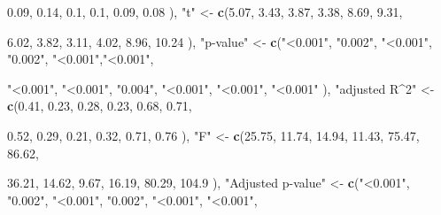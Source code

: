 \documentclass[
]{article}
\newenvironment{Shaded}{\begin{snugshade}}{\end{snugshade}}
\newcommand{\FloatTok}[1]{\textcolor[rgb]{0.00,0.00,0.81}{#1}}
\newcommand{\KeywordTok}[1]{\textcolor[rgb]{0.13,0.29,0.53}{\textbf{#1}}}
\newcommand{\NormalTok}[1]{#1}
\newcommand{\StringTok}[1]{\textcolor[rgb]{0.31,0.60,0.02}{#1}}
\begin{document}
\begin{Shaded}
\begin{Highlighting}[]
                                      \FloatTok{0.09}\NormalTok{, }\FloatTok{0.14}\NormalTok{, }\FloatTok{0.1}\NormalTok{, }\FloatTok{0.1}\NormalTok{, }\FloatTok{0.09}\NormalTok{, }\FloatTok{0.08}
\NormalTok{                                      ), }
                \StringTok{"t"}\NormalTok{ <-}\StringTok{ }\KeywordTok{c}\NormalTok{(}\FloatTok{5.07}\NormalTok{, }\FloatTok{3.43}\NormalTok{, }\FloatTok{3.87}\NormalTok{, }\FloatTok{3.38}\NormalTok{, }\FloatTok{8.69}\NormalTok{, }\FloatTok{9.31}\NormalTok{,}
                         
                         \FloatTok{6.02}\NormalTok{, }\FloatTok{3.82}\NormalTok{, }\FloatTok{3.11}\NormalTok{, }\FloatTok{4.02}\NormalTok{, }\FloatTok{8.96}\NormalTok{, }\FloatTok{10.24}
\NormalTok{                         ),}
                \StringTok{"p-value"}\NormalTok{ <-}\StringTok{ }\KeywordTok{c}\NormalTok{(}\StringTok{"<0.001"}\NormalTok{, }\StringTok{"0.002"}\NormalTok{, }\StringTok{"<0.001"}\NormalTok{, }\StringTok{"0.002"}\NormalTok{, }\StringTok{"<0.001"}\NormalTok{,}\StringTok{"<0.001"}\NormalTok{,}
                               
                               \StringTok{"<0.001"}\NormalTok{, }\StringTok{"<0.001"}\NormalTok{, }\StringTok{"0.004"}\NormalTok{, }\StringTok{"<0.001"}\NormalTok{, }\StringTok{"<0.001"}\NormalTok{, }\StringTok{"<0.001"}
\NormalTok{                               ),}
                \StringTok{"adjusted R^2"}\NormalTok{ <-}\StringTok{ }\KeywordTok{c}\NormalTok{(}\FloatTok{0.41}\NormalTok{, }\FloatTok{0.23}\NormalTok{, }\FloatTok{0.28}\NormalTok{, }\FloatTok{0.23}\NormalTok{, }\FloatTok{0.68}\NormalTok{, }\FloatTok{0.71}\NormalTok{,}
                                    
                                    \FloatTok{0.52}\NormalTok{, }\FloatTok{0.29}\NormalTok{, }\FloatTok{0.21}\NormalTok{, }\FloatTok{0.32}\NormalTok{, }\FloatTok{0.71}\NormalTok{, }\FloatTok{0.76}
\NormalTok{                                    ),}
                \StringTok{"F"}\NormalTok{ <-}\StringTok{ }\KeywordTok{c}\NormalTok{(}\FloatTok{25.75}\NormalTok{, }\FloatTok{11.74}\NormalTok{, }\FloatTok{14.94}\NormalTok{, }\FloatTok{11.43}\NormalTok{, }\FloatTok{75.47}\NormalTok{, }\FloatTok{86.62}\NormalTok{,}
                         
                         \FloatTok{36.21}\NormalTok{, }\FloatTok{14.62}\NormalTok{, }\FloatTok{9.67}\NormalTok{, }\FloatTok{16.19}\NormalTok{, }\FloatTok{80.29}\NormalTok{, }\FloatTok{104.9}
\NormalTok{                         ),}
                \StringTok{"Adjusted p-value"}\NormalTok{ <-}\StringTok{ }\KeywordTok{c}\NormalTok{(}\StringTok{"<0.001"}\NormalTok{, }\StringTok{"0.002"}\NormalTok{, }\StringTok{"<0.001"}\NormalTok{, }\StringTok{"0.002"}\NormalTok{, }\StringTok{"<0.001"}\NormalTok{, }\StringTok{"<0.001"}\NormalTok{,}
                                        

\end{Highlighting}
\end{Shaded}
\end{document}
